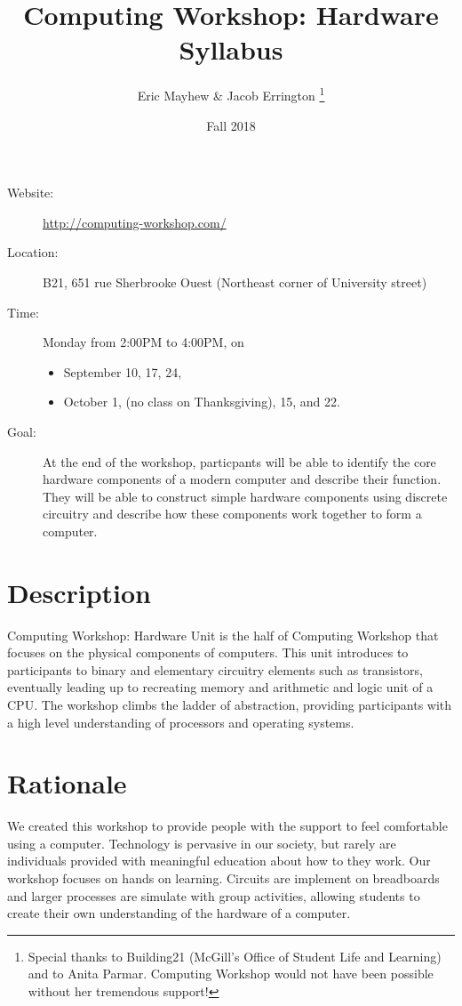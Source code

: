 \documentclass[11pt]{article}
\author{%
  Eric Mayhew \& Jacob Errington%
  \footnote{%
    Special thanks to Building21 (McGill's Office of Student Life and Learning)
    and to Anita Parmar.
    Computing Workshop would not have been possible without her tremendous
    support!
  }
}
\title{Computing Workshop: Hardware Syllabus}
\date{Fall 2018}
\begin{document}
\maketitle

\begin{description}
  \item[Website:]
    \url{http://computing-workshop.com/}

  \item[Location:]
    B21, 651 rue Sherbrooke Ouest
    (Northeast corner of University street)

  \item[Time:]
    Monday from 2:00PM to 4:00PM, on
    \begin{itemize}
    \item September 10, 17, 24,
    \item October 1, (no class on Thanksgiving), 15, and 22.
    \end{itemize}

  \item[Goal:]
    At the end of the workshop, particpants will be able to identify the core
    hardware components of a modern computer and describe their function.
    They will be able to construct simple hardware components using discrete
    circuitry and describe how these components work together to form
    a computer.
\end{description}

\section*{Description}

Computing Workshop: Hardware Unit is the half of Computing Workshop that focuses
on the physical components of computers. This unit introduces to participants to binary and elementary circuitry elements
such as transistors, eventually leading up to recreating memory and arithmetic and logic unit of a CPU. The workshop
climbs the ladder of abstraction, providing participants with a high level understanding of processors and operating systems.

\section*{Rationale}

We created this workshop to provide people with the support to feel comfortable
using a computer. Technology is pervasive in our society, but rarely are
individuals provided with meaningful education about how to they work. Our workshop focuses on hands on learning.
Circuits are implement on breadboards and larger processes are simulate with group activities, allowing students to
create their own understanding of the hardware of a computer.
\end{document}
